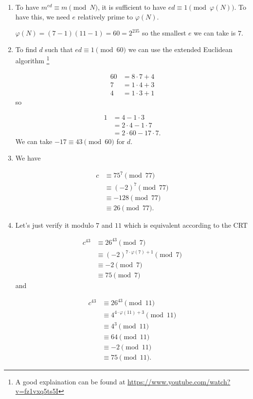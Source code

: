 \begin{solution}
	\begin{enumerate}
		\item
		To have $m^{ed} \equiv m \pmod{N}$,
		it is sufficient to have $ed \equiv 1 \pmod{\varphi(N)}$.
		To have this, we need $e$ relatively prime to $\varphi(N)$.
		
		$\varphi(N) = (7-1)(11-1) = 60 = 2^235$
		so the smallest $e$ we can take is $7$.
		\item
		To find $d$ such that $ed \equiv 1 \pmod{60}$ we
		can use the extended Euclidean algorithm \footnote{A good explaination can be found at \url{https://www.youtube.com/watch?v=fz1vxq5ts5I}}
		
		\begin{align*}
			60 & = 8 \cdot 7 + 4\\
			7 & = 1 \cdot 4 + 3\\
			4 & = 1 \cdot 3 + 1
		\end{align*}
		so
		
		\begin{align*}
			1 & = 4 - 1 \cdot 3\\
			& = 2 \cdot 4 - 1 \cdot 7\\
			& = 2 \cdot 60 - 17 \cdot 7.
		\end{align*}
		We can take $-17 \equiv 43 \pmod{60}$ for $d$.
		\item
		We have
		
		\begin{align*}
			c & \equiv 75^7 \pmod{77}\\
			& \equiv (-2)^7 \pmod{77}\\
			& \equiv -128 \pmod{77}\\
			& \equiv 26 \pmod{77}.
		\end{align*}
		\item
		Let's just verify it modulo $7$ and $11$ which is equivalent
		according to the CRT
		
		\begin{align*}
			c^{43} & \equiv 26^{43} \pmod{7}\\
			& \equiv (-2)^{7 \cdot \varphi(7) + 1} \pmod{7}\\
			& \equiv -2 \pmod{7}\\
			& \equiv 75 \pmod{7}
		\end{align*}
		and
		
		\begin{align*}
			c^{43} & \equiv 26^{43} \pmod{11}\\
			& \equiv 4^{4 \cdot \varphi(11) + 3} \pmod{11}\\
			& \equiv 4^{3} \pmod{11}\\
			& \equiv 64 \pmod{11}\\
			& \equiv -2 \pmod{11}\\
			& \equiv 75 \pmod{11}.
		\end{align*}
	\end{enumerate}
\end{solution}


